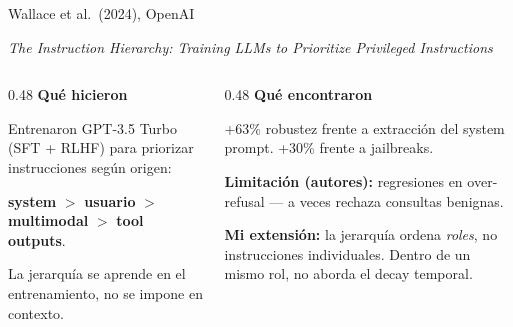 \documentclass[aspectratio=169, 11pt]{beamer}
\begin{document}
\begin{frame}{Wallace et al.\ (2024), OpenAI}

\textit{The Instruction Hierarchy: Training LLMs to Prioritize Privileged Instructions}

\vspace{0.6em}

\begin{columns}[T]
\begin{column}{0.48\textwidth}
\textbf{Qu\'e hicieron}

\vspace{0.3em}
\footnotesize
Entrenaron GPT-3.5 Turbo (SFT + RLHF) para priorizar instrucciones seg\'un origen:

\vspace{0.3em}
\textbf{system} $>$ \textbf{usuario} $>$ \textbf{multimodal} $>$ \textbf{tool outputs}.

\vspace{0.5em}
La jerarqu\'ia se aprende en el entrenamiento, no se impone en contexto.
\end{column}

\begin{column}{0.48\textwidth}
\textbf{Qu\'e encontraron}

\vspace{0.3em}
\footnotesize
+63\% robustez frente a extracci\'on del system prompt. +30\% frente a jailbreaks.

\vspace{0.6em}

\textbf{Limitaci\'on (autores):} regresiones en over-refusal — a veces rechaza consultas benignas.

\vspace{0.5em}

\textbf{Mi extensi\'on:} la jerarqu\'ia ordena \emph{roles}, no instrucciones individuales. Dentro de un mismo rol, no aborda el decay temporal.
\end{column}
\end{columns}

\end{frame}
\end{document}
